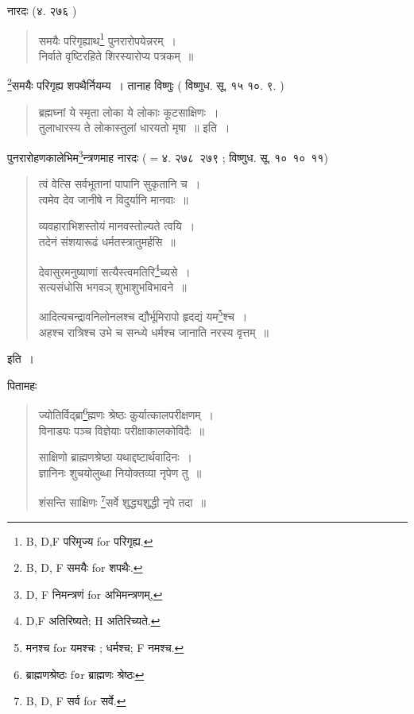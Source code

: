 \documentclass[11pt, openany]{book}
\begin{document}
नारदः (४. २७६ )

\begin{quote}
{\vy समयैः परिगृह्याथ\renewcommand{\thefootnote}{3}\footnote{B, D,F परिमृज्य for परिगृह्य.} पुनरारोपयेन्नरम्~।\\
निर्वाते वृष्टिरहिते शिरस्यारोप्य पत्रकम्~॥}
\end{quote}

\renewcommand{\thefootnote}{4}\footnote{B, D, F समयैः for शपथैः.}समयैः परिगृह्य शपथैर्नियम्य~। तानाह विष्णुः ( विष्णुध. सू. १५ १०. ९. )

\begin{quote}
{\vy ब्रह्मघ्नां ये स्मृता लोका ये लोकाः कूटसाक्षिणः~।\\
तुलाधारस्य ते लोकास्तुलां धारयतो मृषा~॥} इति~।
\end{quote}

पुनरारोहणकालेभिम\renewcommand{\thefootnote}{5}\footnote{D, F निमन्त्रणं for अभिमन्त्रणम्,}न्त्रणमाह नारदः ($=$४. २७८\textendash\ २७९ ; विष्णुध. सू. १०\textendash\ १०\textendash\ ११)

\newpage 

\begin{quote}
{\vy त्वं वेत्सि सर्वभूतानां पापानि सुकृतानि च~।\\
त्वमेव देव जानीषे न विदुर्यानि मानवाः~॥

व्यवहाराभिशस्तोयं मानवस्तोल्यते त्वयि~।\\
तदेनं संशयारूढं धर्मतस्त्रातुमर्हसि~॥

देवासुरमनुष्याणां सत्यैस्त्वमतिरि\renewcommand{\thefootnote}{1}\footnote{D,F अतिरिष्यते; H अतिरिच्यते.}च्यसे~।\\
सत्यसंधोसि भगवञ् शुभाशुभविभावने~॥

आदित्यचन्द्रावनिलोनलश्च द्यौर्भूमिरापो हृदद्यं यम\renewcommand{\thefootnote}{2}\footnote{मनश्च for यमश्चः ; धर्मश्च; F नमश्च.}श्च~।\\
अहश्च रात्रिश्च उभे च सन्ध्ये धर्मश्च जानाति नरस्य वृत्तम्~॥}
\end{quote}

इति~।

पितामहः

\begin{quote}
{\vy ज्योतिर्विद्ब्रा\renewcommand{\thefootnote}{3}\footnote{ब्राह्मणश्रेष्ठः f०r ब्राह्मणः श्रेष्ठः}ह्मणः श्रेष्ठः कुर्यात्कालपरीक्षणम्~।\\
विनाड्यः पञ्च विज्ञेयाः परीक्षाकालकोविदैः~॥

साक्षिणो ब्राह्मणश्रेष्ठा यथाद्दष्टार्थवादिनः~।\\
ज्ञानिनः शुचयोलुब्धा नियोक्तव्या नृपेण तु~॥

शंसन्ति साक्षिणः \renewcommand{\thefootnote}{4}\footnote{B, D, F सर्व for सर्वे.}सर्वे शुद्ध्यशुद्धी नृपे तदा~॥}
\end{quote}
\end{document}
